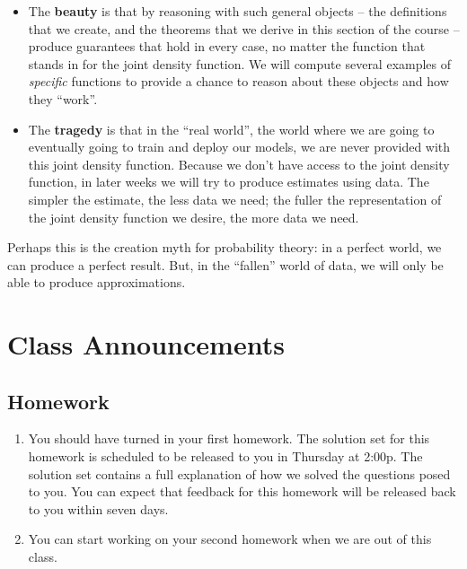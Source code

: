 \documentclass[
  letterpaper,
  DIV=11,
  numbers=noendperiod]{scrreprt}
\providecommand{\tightlist}{%
  \setlength{\itemsep}{0pt}\setlength{\parskip}{0pt}}\usepackage{longtable,booktabs,array}
\begin{document}
\begin{itemize}
\tightlist
\item
  The \textbf{beauty} is that by reasoning with such general objects --
  the definitions that we create, and the theorems that we derive in
  this section of the course -- produce guarantees that hold in every
  case, no matter the function that stands in for the joint density
  function. We will compute several examples of \emph{specific}
  functions to provide a chance to reason about these objects and how
  they ``work''.
\item
  The \textbf{tragedy} is that in the ``real world'', the world where we
  are going to eventually going to train and deploy our models, we are
  never provided with this joint density function. Because we don't have
  access to the joint density function, in later weeks we will try to
  produce estimates using data. The simpler the estimate, the less data
  we need; the fuller the representation of the joint density function
  we desire, the more data we need.
\end{itemize}

Perhaps this is the creation myth for probability theory: in a perfect
world, we can produce a perfect result. But, in the ``fallen'' world of
data, we will only be able to produce approximations.

\section{Class Announcements}\label{class-announcements}

\subsection*{Homework}\label{homework}

\begin{enumerate}
\def\labelenumi{\arabic{enumi}.}
\tightlist
\item
  You should have turned in your first homework. The solution set for
  this homework is scheduled to be released to you in Thursday at 2:00p.
  The solution set contains a full explanation of how we solved the
  questions posed to you. You can expect that feedback for this homework
  will be released back to you within seven days.
\item
  You can start working on your second homework when we are out of this
  class.
\end{enumerate}
\end{document}
